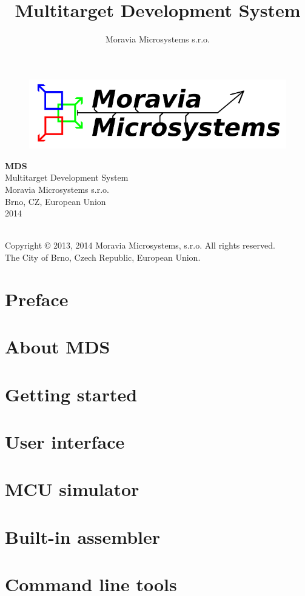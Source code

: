 \documentclass[a4paper,twosided, 15pt]{book}
\title{Multitarget Development System}
\author{Moravia Microsystems s.r.o.}
\begin{document}
    \begin{titlepage}
        \begin{figure}[ht!]
            \centering
            \includegraphics[width=.9\textwidth]{img/Moravia_Microsystems.png}
        \end{figure}
        \begin{center}
            \fontsize{35.83pt}{60pt} \selectfont{}
            \textbf{MDS}
            \\[1cm]
            \fontsize{25pt}{30pt} \selectfont{}
            Multitarget Development System
            \\[2cm]
            \fontsize{15pt}{19pt} \selectfont{}
            Moravia Microsystems s.r.o.\\
            Brno, CZ, European Union\\
            2014
        \end{center}
    \end{titlepage}

    {
        ~\\
        Copyright \copyright{} 2013, 2014 Moravia Microsystems, s.r.o. All rights reserved.\\
        The City of Brno, Czech Republic, European Union.
    }

    \tableofcontents

    \chapter{Preface}
        

    \chapter{About MDS}
        

    \chapter{Getting started}
        

    \chapter{User interface}
        

    \chapter{MCU simulator}
        

    \chapter{Built-in assembler}
        

    \chapter{Command line tools}
        

    \printindex
    \listoftables
\end{document}
